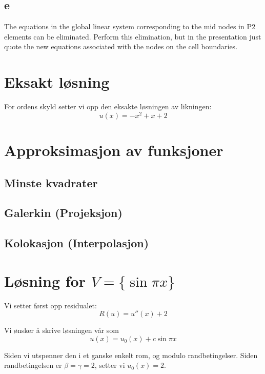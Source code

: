 \documentclass[a4paper, 10pt]{article}
\begin{document}
\subsection*{e} The equations in the global linear system corresponding to the mid nodes in P2 elements can be eliminated. Perform this elimination, but in the presentation just quote the new equations associated with the nodes on the cell boundaries. 

\section{Eksakt løsning}
For ordens skyld setter vi opp den eksakte løsningen av likningen:
\begin{equation}
	u(x) = -x^2 + x + 2
\end{equation}

\section{Approksimasjon av funksjoner}

\subsection{Minste kvadrater}

\subsection{Galerkin (Projeksjon)}

\subsection{Kolokasjon (Interpolasjon)}

\section{Løsning for $V = \{\sin \pi x\}$}

Vi setter først opp residualet:
\begin{equation}
	R(u) = u''(x) +2
\end{equation}

Vi ønsker å skrive løsningen vår som
\begin{equation}
	u(x) = u_0(x) + c\sin{\pi x}
\end{equation}


Siden vi utspenner den i et ganske enkelt rom, og modulo randbetingelser.
Siden randbetingelsen er $\beta = \gamma = 2$, setter vi $u_0(x) = 2$.
\end{document}
